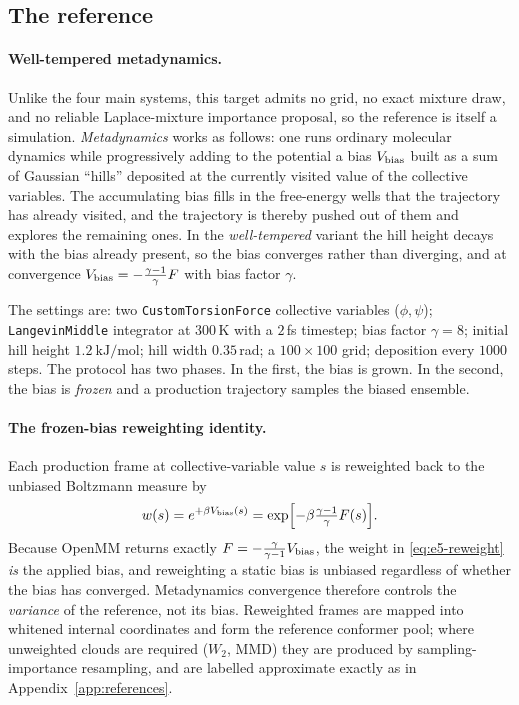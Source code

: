 \documentclass[11pt]{article}
\begin{document}
\subsection{The reference}
\label{app:e5-reference}

\paragraph{Well-tempered metadynamics.}
Unlike the four main systems, this target admits no grid, no exact mixture
draw, and no reliable Laplace-mixture importance proposal, so the reference is
itself a simulation.  \emph{Metadynamics} works as follows: one runs ordinary
molecular dynamics while progressively adding to the potential a bias
$V_{\rm bias}$ built as a sum of Gaussian ``hills'' deposited at the currently
visited value of the collective variables.  The accumulating bias fills in the
free-energy wells that the trajectory has already visited, and the trajectory
is thereby pushed out of them and explores the remaining ones.  In the
\emph{well-tempered} variant the hill height decays with the bias already
present, so the bias converges rather than diverging, and at convergence
$V_{\rm bias}=-\frac{\gamma-1}{\gamma}F$ with bias factor $\gamma$.

The settings are: two \texttt{CustomTorsionForce} collective variables
($\phi,\psi$); \texttt{LangevinMiddle} integrator at $300\,$K with a $2\,$fs
timestep; bias factor $\gamma=8$; initial hill height $1.2\ \mathrm{kJ/mol}$;
hill width $0.35\,$rad; a $100\times100$ grid; deposition every $1000$ steps.
The protocol has two phases.  In the first, the bias is grown.  In the second,
the bias is \emph{frozen} and a production trajectory samples the biased
ensemble.

\paragraph{The frozen-bias reweighting identity.}
Each production frame at collective-variable value $s$ is reweighted back to
the unbiased Boltzmann measure by
\begin{equation}
 w(s)=e^{+\beta V_{\rm bias}(s)}
 =\exp\Bigl[-\beta\tfrac{\gamma-1}{\gamma}F(s)\Bigr].
 \label{eq:e5-reweight}
\end{equation}
Because OpenMM returns exactly $F=-\frac{\gamma}{\gamma-1}V_{\rm bias}$, the
weight in \eqref{eq:e5-reweight} \emph{is} the applied bias, and reweighting a
static bias is unbiased regardless of whether the bias has converged.
Metadynamics convergence therefore controls the \emph{variance} of the
reference, not its bias.  Reweighted frames are mapped into whitened internal
coordinates and form the reference conformer pool; where unweighted clouds are
required ($W_2$, MMD) they are produced by sampling-importance resampling, and
are labelled approximate exactly as in Appendix~\ref{app:references}.
\end{document}
